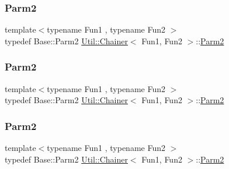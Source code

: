 \mbox{\label{classUtil_1_1Chainer_a1bfb0e8f35679278c85d232a74a107ff}} 
\subsubsection{\texorpdfstring{Parm2}{Parm2}\hspace{0.1cm}{\footnotesize\ttfamily [1/3]}}
{\footnotesize\ttfamily template$<$typename Fun1 , typename Fun2 $>$ \\
typedef Base\+::\+Parm2 \mbox{\hyperlink{classUtil_1_1Chainer}{Util\+::\+Chainer}}$<$ Fun1, Fun2 $>$\+::\mbox{\hyperlink{classUtil_1_1Chainer_a1bfb0e8f35679278c85d232a74a107ff}{Parm2}}}

\mbox{\label{classUtil_1_1Chainer_a1bfb0e8f35679278c85d232a74a107ff}} 
\subsubsection{\texorpdfstring{Parm2}{Parm2}\hspace{0.1cm}{\footnotesize\ttfamily [2/3]}}
{\footnotesize\ttfamily template$<$typename Fun1 , typename Fun2 $>$ \\
typedef Base\+::\+Parm2 \mbox{\hyperlink{classUtil_1_1Chainer}{Util\+::\+Chainer}}$<$ Fun1, Fun2 $>$\+::\mbox{\hyperlink{classUtil_1_1Chainer_a1bfb0e8f35679278c85d232a74a107ff}{Parm2}}}

\mbox{\label{classUtil_1_1Chainer_a1bfb0e8f35679278c85d232a74a107ff}} 
\subsubsection{\texorpdfstring{Parm2}{Parm2}\hspace{0.1cm}{\footnotesize\ttfamily [3/3]}}
{\footnotesize\ttfamily template$<$typename Fun1 , typename Fun2 $>$ \\
typedef Base\+::\+Parm2 \mbox{\hyperlink{classUtil_1_1Chainer}{Util\+::\+Chainer}}$<$ Fun1, Fun2 $>$\+::\mbox{\hyperlink{classUtil_1_1Chainer_a1bfb0e8f35679278c85d232a74a107ff}{Parm2}}}

